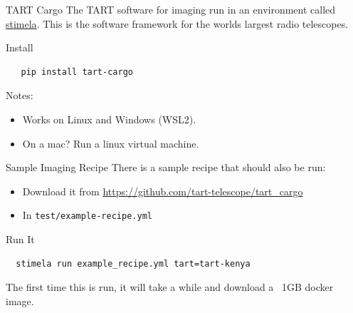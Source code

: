 \documentclass[ignorenonframetext]{beamer}
\begin{document}
\begin{frame}[fragile]{TART Cargo}
  The TART software for imaging run in an environment called \href{https://github.com/caracal-pipeline/stimela}{stimela}. This is the software framework for the worlds largest radio telescopes.

  \begin{block}{Install}
  \begin{verbatim}
   pip install tart-cargo
  \end{verbatim}
  \end{block}

  Notes:
  \begin{itemize}
   \item Works on Linux and Windows (WSL2).
   \item On a mac? Run a linux virtual machine.
  \end{itemize}

\end{frame}


\begin{frame}[fragile]{Sample Imaging Recipe}
There is a sample recipe that should also be run:
\begin{itemize}
 \item Download it from \url{https://github.com/tart-telescope/tart_cargo}
 \item In \verb!test/example-recipe.yml!
\end{itemize}
\begin{block}{Run It}
 \begin{verbatim}
  stimela run example_recipe.yml tart=tart-kenya
 \end{verbatim}
\end{block}
 The first time this is run, it will take a while and download a ~1GB docker image.
\end{frame}
\end{document}
